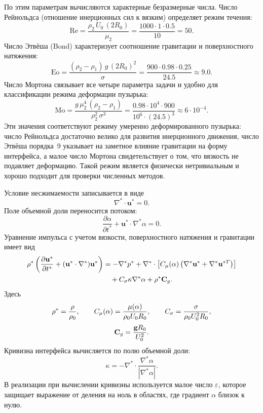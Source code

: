По этим параметрам вычисляются характерные безразмерные числа. Число Рейнольдса
(отношение инерционных сил к вязким) определяет режим течения:
\begin{equation}
    \mathrm{Re} = \frac{\rho_2\,U_0\,(2R_0)}{\mu_2}
    = \frac{1000\cdot 1\cdot 0.5}{10} = 50.
\end{equation}
Число Этвёша (Bond) характеризует соотношение гравитации и поверхностного
натяжения:
\begin{equation}
    \mathrm{Eo} = \frac{(\rho_2-\rho_1)\,g\,(2R_0)^2}{\sigma}
    = \frac{900\cdot 0.98\cdot 0.25}{24.5} \approx 9.0.
\end{equation}
Число Мортона связывает все четыре параметра задачи и удобно для классификации
режима деформации пузырька:
\begin{equation}
    \mathrm{Mo} = \frac{g\,\mu_2^4\,(\rho_2-\rho_1)}{\rho_2^2\,\sigma^3}
    = \frac{0.98\cdot 10^4\cdot 900}{10^6\cdot (24.5)^3} \approx 6\cdot 10^{-4}.
\end{equation}
Эти значения соответствуют режиму умеренно деформированного пузырька:
число Рейнольдса достаточно велико для развития инерционного движения, число
Этвёша порядка~9 указывает на заметное влияние гравитации на форму
интерфейса, а малое число Мортона свидетельствует о том, что вязкость не
подавляет деформацию. Такой режим является физически нетривиальным и хорошо
подходит для проверки численных методов.

Условие несжимаемости записывается в виде
\begin{equation}
    \nabla^*\cdot\mathbf{u}^*=0.
    \label{eq:chapter2_mass}
\end{equation}
Поле объемной доли переносится потоком:
\begin{equation}
    \frac{\partial\alpha}{\partial t^*}
    +\mathbf{u}^*\cdot\nabla^*\alpha=0.
    \label{eq:chapter2_alpha_transport}
\end{equation}
Уравнение импульса с учетом вязкости, поверхностного натяжения и гравитации
имеет вид
\begin{align}
    \rho^*
    \left(
        \frac{\partial\mathbf{u}^*}{\partial t^*}
        +(\mathbf{u}^*\cdot\nabla^*)\mathbf{u}^*
    \right)
    &=
    -\nabla^*p^*
    +\nabla^*\cdot
    \left[
        C_\mu(\alpha)
        \left(\nabla^*\mathbf{u}^*+\nabla^*\mathbf{u}^{*T}\right)
    \right]
    \notag\\
    &\quad
    +C_\sigma\kappa\nabla^*\alpha
    +\rho^*\mathbf{C}_g.
    \label{eq:chapter2_momentum}
\end{align}
Здесь
\[
    \rho^*=\frac{\rho}{\rho_0},
    \qquad
    C_\mu(\alpha)=\frac{\mu(\alpha)}{\rho_0U_0R_0},
    \qquad
    C_\sigma=\frac{\sigma}{\rho_0U_0^2R_0},
\]
\[
    \mathbf{C}_g=\frac{\mathbf{g}R_0}{U_0^2}.
\]
Кривизна интерфейса вычисляется по полю объемной доли:
\begin{equation}
    \kappa
    =
    -\nabla^*\cdot
    \frac{\nabla^*\alpha}{|\nabla^*\alpha|}.
    \label{eq:chapter2_curvature}
\end{equation}
В реализации при вычислении кривизны используется малое число
\(\varepsilon\), которое защищает выражение от деления на ноль в областях, где
градиент \(\alpha\) близок к нулю.

